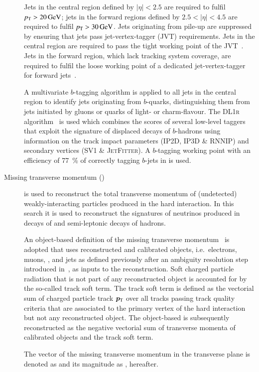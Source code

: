\begin{description}
  Jets in the central region defined by $|\eta| < 2.5$ are required to
  fulfil $\pT > \SI{20}{\GeV}$; jets in the forward regions defined
  by $2.5 < |\eta| < 4.5$ are required to fulfil
  $\pT > \SI{30}{\GeV}$. Jets originating from pile-up are suppressed
  by ensuring that jets pass jet-vertex-tagger (JVT)
  requirements. Jets in the central region are required to pass the
  tight working point of the JVT~\cite{PERF-2014-03}. Jets in the
  forward region, which lack tracking system coverage, are required to
  fulfil the loose working point of a dedicated jet-vertex-tagger for
  forward jets~\cite{PERF-2016-06-witherratum,ATL-PHYS-PUB-2019-026}.

  A multivariate $b$-tagging algorithm is applied to all jets in the
  central region to identify jets originating from $b$-quarks,
  distinguishing them from jets initiated by gluons or quarks of
  light- or charm-flavour. The \textsc{DL1r}
  algorithm~\cite{FTAG-2018-01,ATL-PHYS-PUB-2017-013} is used which
  combines the scores of several low-level taggers that exploit the
  signature of displaced decays of $b$-hadrons using information on
  the track impact parameters (\textsc{IP2D}, \textsc{IP3D} \&
  \textsc{RNNIP}) and secondary vertices (\textsc{SV1} \&
  \textsc{JetFitter}). A $b$-tagging working point with an efficiency
  of \SI{77}{\percent} of correctly tagging $b$-jets in \ttbar is
  used.

\item[Missing transverse momentum (\pTmiss)] is used to reconstruct
  the total transverse momentum of (undetected) weakly-interacting
  particles produced in the hard interaction. In this search it is
  used to reconstruct the signatures of neutrinos produced in decays
  of \tauleptons and semi-leptonic decays of hadrons.

  An object-based definition of the missing transverse
  momentum~\cite{PERF-2016-07} is adopted that uses reconstructed and
  calibrated objects, i.e.\ electrons, muons, \tauhadvis, and jets as
  defined previously after an ambiguity resolution step introduced
  in~, as inputs to the \pTmiss
  reconstruction. Soft charged particle radiation that is not part of
  any reconstructed object is accounted for by the so-called track
  soft term. The track soft term is defined as the vectorial sum of
  charged particle track $\bm{p}_{\text{T}}$ over all tracks passing track
  quality criteria that are associated to the primary vertex of the
  hard interaction but not any reconstructed object. The object-based
  \pTmiss is subsequently reconstructed as the negative vectorial sum
  of transverse momenta of calibrated objects and the track soft
  term.

  The vector of the missing transverse momentum in the transverse
  plane is denoted as \pTmiss and its magnitude as \pTmissAbs,
  hereafter.
\end{description}


